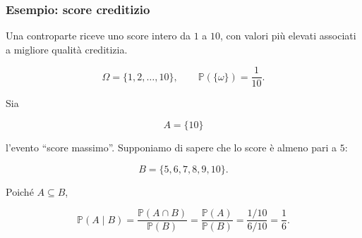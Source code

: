 \documentclass[handout]{beamer}%
\providecommand{\Prob}{\mathbb{P}}
\providecommand{\1}{\mathbf{1}}
\providecommand{\QTR}[2]{\csname #1\endcsname{#2}}
\begin{document}
\begin{frame}%
%

\frametitle{Esempio: score creditizio}%


Una controparte riceve uno score intero da $1$ a $10$, con valori pi\`{u}
elevati associati a migliore qualit\`{a} creditizia.%

\[
\Omega=\{1,2,\ldots,10\}, \qquad\Prob(\{\omega\})=\frac{1}{10}.
\]


\medskip

Sia%

\[
A=\{10\}
\]


l'evento ``score massimo''. Supponiamo di sapere che lo score \`{e} almeno
pari a $5$:%

\[
B=\{5,6,7,8,9,10\}.
\]


\medskip

Poich\'{e} $A\subseteq B$,%

\[
\Prob(A\mid B) = \frac{\Prob(A\cap B)}{\Prob(B)} = \frac{\Prob(A)}{\Prob(B)} =
\frac{1/10}{6/10} = \frac{1}{6}.
\]
%

\transboxout
\end{frame}%


%
\end{document}
